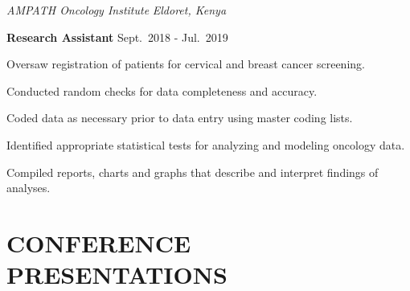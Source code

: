 \documentclass[13pt,]{article}
\providecommand{\tightlist}{%
  \setlength{\itemsep}{0pt}\setlength{\parskip}{0pt}}
\renewenvironment{itemize}{
  \begin{list}{}{
    \setlength{\leftmargin}{1.5em}
  }
}{
  \end{list}
}
\begin{document}
\emph{AMPATH Oncology Institute} \hfill \emph{Eldoret, Kenya}

\textbf{Research Assistant} \hfill Sept.~2018 - Jul.~2019

\begin{itemize}
\tightlist
\item
  Oversaw registration of patients for cervical and breast cancer
  screening.
\item
  Conducted random checks for data completeness and accuracy.
\item
  Coded data as necessary prior to data entry using master coding lists.
\item
  Identified appropriate statistical tests for analyzing and modeling
  oncology data.
\item
  Compiled reports, charts and graphs that describe and interpret
  findings of analyses.
\end{itemize}

\section{\texorpdfstring{\textbf{CONFERENCE
PRESENTATIONS}}{CONFERENCE PRESENTATIONS}}\label{conference-presentations}
\end{document}

